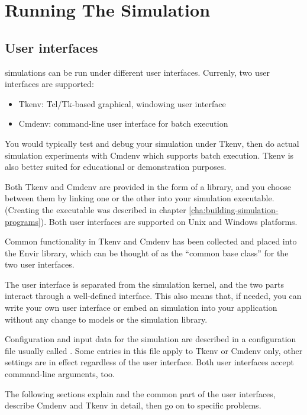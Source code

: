 \chapter{Running The Simulation}
\label{cha:running-the-simulation}

\section{User interfaces}

{\opp} simulations can be run under different user interfaces.
Currenly, two user interfaces are supported:

\begin{itemize}
  \item Tkenv: Tcl/Tk-based graphical, windowing user interface
  \item Cmdenv: command-line user interface for batch execution
\end{itemize}


You would typically test and debug your simulation under Tkenv,
then do actual simulation experiments with Cmdenv which supports
batch execution. Tkenv is also better suited for educational or
demonstration purposes.

Both Tkenv and Cmdenv are provided in the form of a library, and
you choose between them by linking one or the other into your
simulation executable. (Creating the executable was described in
chapter \ref{cha:building-simulation-programs}). Both user interfaces
are supported on Unix and Windows platforms.

Common functionality in Tkenv and Cmdenv has been collected and
placed into the Envir library, which can be thought of as the
``common base class'' for the two user interfaces.

The user interface is separated from the
simulation kernel, and the two parts interact through a well-defined
interface. This also means that, if needed, you can write your
own user interface or embed an {\opp} simulation into your application
without any change to models or the simulation library.

Configuration and input data for the simulation are described in
a configuration file usually called .
Some entries in this file apply to Tkenv or Cmdenv only, other
settings are in effect regardless of the user interface.
Both user interfaces accept command-line arguments, too.


The following sections explain  and the common part of
the user interfaces, describe Cmdenv and Tkenv in detail, then
go on to specific problems.


